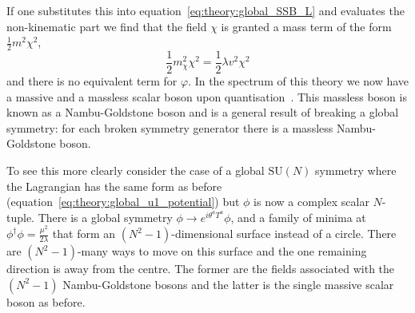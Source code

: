 If one substitutes this into equation~\ref{eq:theory:global_SSB_L} and evaluates the non-kinematic part we find that the field $\chi$ is granted a mass term of the form $\frac{1}{2}m^{2}\chi^{2}$,
\begin{equation}
    \frac{1}{2}m_{\chi}^{2}\chi^{2} = \frac{1}{2}{\lambda}v^{2}\chi^{2}
\end{equation}
and there is no equivalent term for $\varphi$. In the spectrum of this theory we now have a massive and a massless scalar boson upon quantisation~\cite{Nambu,Goldstone}. This massless boson is known as a Nambu-Goldstone boson and is a general result of breaking a global symmetry: for each broken symmetry generator there is a massless Nambu-Goldstone boson. 

To see this more clearly consider the case of a global $\mathrm{SU}(N)$ symmetry where the Lagrangian has the same form as before (equation~\ref{eq:theory:global_u1_potential}) but $\phi$ is now a complex scalar $N$-tuple. 
There is a global symmetry $\phi\rightarrow{e^{i\theta^{a}T^{a}}}\phi$, and a family of minima at $\phi^{\dag}\phi = \frac{\mu^{2}}{2\lambda}$ that form an $(N^{2}-1)$-dimensional surface instead of a circle. There are $(N^{2}-1)$-many ways to move on this surface and the one remaining direction is away from the centre. The former are the fields associated with the $(N^{2}-1)$ Nambu-Goldstone bosons and the latter is the single massive scalar boson as before. 

